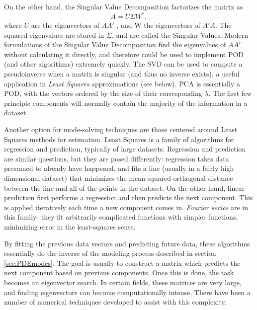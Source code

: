 \documentclass[a4paper,10pt]{report}
\numberwithin{equation}{section}
\begin{document}
On the other hand, the Singular Value Decomposition factorizes the matrix as
\begin{equation}
A = U\Sigma W^* , 
\end{equation}
where $U$ are the eigenvectors of $A A'$ , and W the eigenvectors of $A'A$. The squared eigenvalues are stored in $\Sigma$, and are called the Singular Values. Modern formulations of the Singular Value Decomposition find the eigenvalues of $A A'$ without calculating it directly, and therefore could be used to implement POD (and other algorithms) extremely quickly. \cite[p.~368]{Watkins2010} The SVD can be used to compute a pseudoinverse when a matrix is singular (and thus no inverse exists), a useful application in \emph{Least Squares} approximations (see below). PCA is essentially a POD, with the vectors ordered by the size of their corresponding $\lambda$. The first few principle components will normally contain the majority of the information in a dataset. \cite[p.~4]{Fodor2002} 

Another option for mode-solving techniques are those centered around Least Squares methods for estimation. Least Squares is a family of algorithms for regression and prediction, typically of large datasets. Regression and prediction are similar questions, but they are posed differently: regression takes data presumed to already have happened, and fits a line (usually in a fairly high dimensional dataset) that minimizes the mean squared orthogonal distance between the line and all of the points in the dataset. On the other hand, linear prediction first performs a regression and then predicts the next component. This is applied iteratively each time a new component comes in. \emph{Fourier series} are in this family- they fit arbitrarily complicated functions with simpler functions, minimizing error in the least-squares sense. \cite[p.~224]{Strang2009} 

By fitting the previous data vectors and predicting future data, these algorithms essentially do the inverse of the modeling process described in section \ref{sec:PDEmodes}. The goal is usually to construct a matrix which predicts the next component based on previous components. Once this is done, the task becomes an eigenvector search. In certain fields, these matrices are very large, and finding eigenvectors can become computationally intense. There have been a number of numerical techniques developed to assist with this complexity. 
\end{document}
